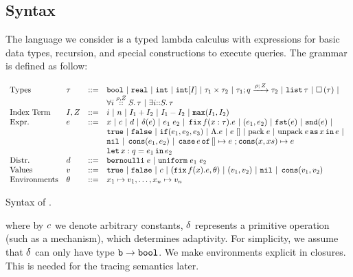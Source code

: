 \documentclass[acmsmall,review,anonymous]{acmart}\settopmatter{printfolios=true,printccs=false,printacmref=false}
\begin{document}
\section{\THESYSTEM}
\subsection{Syntax}
The language we consider is a typed lambda calculus with expressions
for basic data types, recursion, and special constructions to execute
queries. The grammar is defined as follow:

\begin{table}
\[\begin{array}{llll}
  \mbox{Types} & \type & ::= & \tbool ~|~  \treal ~|~  \tint ~|~   \tint[I] ~|~ \type_1 \times
  \type_2 ~|~ \tarr{\type_1}{\type_2}{\nnatbiA}{\dmap}{\nnatA} ~|~
                              \tlist{\type} ~|~ \tbox{\type}~|~ \\
& & &                      \tforall{\dmap}{\nnatA}{i} \type  ~|~ \texists{i} \type\\
\mbox{Index Term} & \idx, \nnatA & ::= &     i ~|~ n ~|~ \idx_1 + \idx_2 ~|~  \idx_1
                                 - \idx_2 ~|~ \smax{\idx_1}{\idx_2}\\
\mbox{Expr.} & \expr & ::= & x ~|~ \econst ~|~ \distr ~|~ \eop(\expr) ~|~ \expr_1 \eapp \expr_2 ~|~ \efix f(x:\tau).\expr
 ~|~ (\expr_1, \expr_2) ~|~ \eprojl(\expr) ~|~ \eprojr(\expr) ~| \\
%
& & & \etrue ~|~ \efalse ~|~ \eif(\expr_1, \expr_2, \expr_3) ~|~ \eilam \expr  ~|~  \expr \eapp []  ~|~
                            \epack \expr ~|~ \eunpack \expr \eas x
                            \ein \expr ~|~
\\
& & &  \enil ~|~  \econs (
      \expr_1, \expr_2) ~|~ 
      \ecase \expr \eof\, []\mapsto\expr~;\econs(x,xs)\mapsto\expr\\
& & &  \elet  x:q = \expr_1 \ein \expr_2\\
%
\mbox{Distr.} & \distr & ::= & \bernoulli \eapp \expr ~|~ \uniform \eapp \expr_1 \eapp \expr_2\\      
\mbox{Values} & \valr & ::= & \etrue ~|~ \efalse ~|~ \econst ~|~
(\efix f(x).\expr, \env) ~|~ (\valr_1, \valr_2) 
    ~|~ \enil ~|~ \econs (\valr_1, \valr_2)\\
\mbox{Environments} & \env & ::= & x_1 \mapsto \valr_1, \ldots, x_n \mapsto \valr_n\\
\end{array}\]
\caption{Syntax of \THESYSTEM.}
\label{tab:syntax}
\end{table}
where by $c$ we denote arbitrary constants, $\delta$ represents a primitive operation (such as a
mechanism), which determines adaptivity. For simplicity, we assume
that $\delta$ can only have type $\mathtt{b} \to \mathtt{bool}$. We make
environments explicit in closures. This is needed for the tracing
semantics later.
\end{document}
